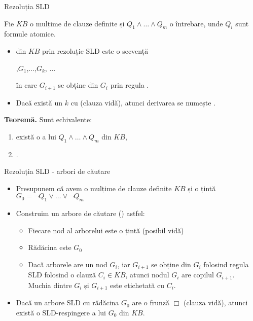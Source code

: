 \documentclass[xcolor=pdftex,romanian,colorlinks]{beamer}
\begin{document}
\begin{frame}{Rezoluția SLD }
 
Fie $KB$ o mulțime de clauze definite și $Q_1 \wedge \ldots \wedge Q_m$ o întrebare, unde $Q_i$ sunt formule atomice.

\begin{itemize}
	\item {} din $KB$ prin rezoluție SLD este o secvență 
\begin{center}
,\quad  $G_1$,\quad $\ldots$,\quad $G_k$, $\ldots$
\end{center}
în care $G_{i+1}$ se obține din $G_i$ prin regula .  

	\item Dacă există un $k$ cu 
 (clauza vidă), atunci  derivarea se numește .
\end{itemize}

\pause
\textbf{Teoremă.} Sunt echivalente:
\begin{enumerate}
\item există o  a lui $Q_1 \wedge \ldots \wedge Q_m$ din  $KB$,
\vspace{.2cm}
\item  {}.
\end{enumerate}
\end{frame}


\begin{frame}{Rezoluția SLD - arbori de căutare}
 \begin{itemize}
 	\item Presupunem că avem o mulțime de clauze definite $KB$ și o țintă $G_0 = \neg Q_1 \vee \ldots \vee \neg Q_m$
	\medskip
	\item Construim un arbore de căutare () astfel:
	\begin{itemize}
		\vspace{.1cm}
		\item Fiecare nod al arborelui este o țintă (posibil vidă)
		\vspace{.1cm}
		\item Rădăcina este $G_0$
		\vspace{.1cm}
		\item Dacă arborele are un nod $G_i$, iar $G_{i+1}$ se obține din $G_i$ folosind regula SLD folosind o clauză $C_i \in KB$, atunci nodul  $G_i$ are copilul $G_{i+1}$. \\
		Muchia dintre $G_i$ și $G_{i+1}$ este etichetată cu $C_i$.
	\end{itemize}
	\medskip
	\item Dacă un arbore SLD cu rădăcina $G_0$ are o frunză $\Box$ (clauza vidă), atunci există o SLD-respingere a lui $G_0$ din $KB$.
\end{itemize}
\end{frame}
\end{document}
